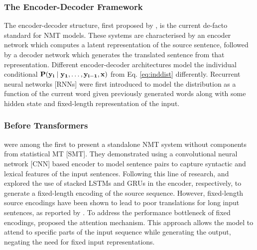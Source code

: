 \documentclass[11pt]{article}
\begin{document}
\subsubsection*{The Encoder-Decoder Framework} \vspace{-2mm}
The encoder-decoder structure, first proposed by \cite{neco1997asynchronous}, is the current de-facto standard for NMT models.
These systems are characterised by an encoder network which computes a latent representation of the source sentence, followed by a decoder network which generates the translated sentence from that representation.
Different encoder-decoder architectures model the individual conditional $\bf P(y_i \mid y_1, \ldots, y_{i - 1}, \bf x)$ from Eq. \ref{eq:inddist} differently.
Recurrent neural networks [RNNs] were first introduced to model the distribution as a function of the current word given previously generated words along with some hidden state and fixed-length representation of the input.

\subsubsection*{Before Transformers} \vspace{-2mm}
\cite{kalchbrenner-blunsom-2013-recurrent-convolutional} were among the first to present a standalone NMT system without components from statistical MT [SMT]. They demonstrated using a convolutional neural network [CNN] based encoder to model sentence pairs to capture syntactic and lexical features of the input sentences.
Following this line of research, \cite{sutskever2014sequence} and \cite{cho-etal-2014-learning} explored the use of stacked LSTMs and GRUs in the encoder, respectively, to generate a fixed-length encoding of the source sequence.
However, fixed-length source encodings have been shown to lead to poor translations for long input sentences, as reported by \cite{cho-etal-2014-properties}.
To address the performance bottleneck of fixed encodings, \cite{DBLP:journals/corr/BahdanauCB14} proposed the attention mechanism. This approach allows the model to attend to specific parts of the input sequence while generating the output, negating the need for fixed input representations.
\end{document}
